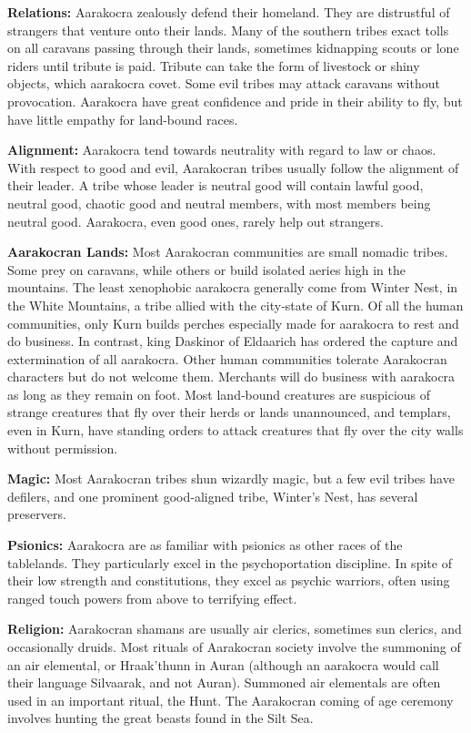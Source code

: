 \textbf{Relations:} Aarakocra zealously defend their homeland. They are distrustful of strangers that venture onto their lands. Many of the southern tribes exact tolls on all caravans passing through their lands, sometimes kidnapping scouts or lone riders until tribute is paid. Tribute can take the form of livestock or shiny objects, which aarakocra covet. Some evil tribes may attack caravans without provocation. Aarakocra have great confidence and pride in their ability to fly, but have little empathy for land-bound races.

\textbf{Alignment:} Aarakocra tend towards neutrality with regard to law or chaos. With respect to good and evil, Aarakocran tribes usually follow the alignment of their leader. A tribe whose leader is neutral good will contain lawful good, neutral good, chaotic good and neutral members, with most members being neutral good. Aarakocra, even good ones, rarely help out strangers.

\textbf{Aarakocran Lands:} Most Aarakocran communities are small nomadic tribes. Some prey on caravans, while others or build isolated aeries high in the mountains. The least xenophobic aarakocra generally come from Winter Nest, in the White Mountains, a tribe allied with the city‐state of Kurn. Of all the human communities, only Kurn builds perches especially made for aarakocra to rest and do business. In contrast, king Daskinor of Eldaarich has ordered the capture and extermination of all aarakocra. Other human communities tolerate Aarakocran characters but do not welcome them. Merchants will do business with aarakocra as long as they remain on foot. Most land‐bound creatures are suspicious of strange creatures that fly over their herds or lands unannounced, and templars, even in Kurn, have standing orders to attack creatures that fly over the city walls without permission.

\textbf{Magic:} Most Aarakocran tribes shun wizardly magic, but a few evil tribes have defilers, and one prominent good‐aligned tribe, Winter's Nest, has several preservers.

\textbf{Psionics:} Aarakocra are as familiar with psionics as other races of the tablelands. They particularly excel in the psychoportation discipline. In spite of their low strength and constitutions, they excel as psychic warriors, often using ranged touch powers from above to terrifying effect.

\textbf{Religion:} Aarakocran shamans are usually air clerics, sometimes sun clerics, and occasionally druids. Most rituals of Aarakocran society involve the summoning of an air elemental, or Hraak'thunn in Auran (although an aarakocra would call their language Silvaarak, and not Auran). Summoned air elementals are often used in an important ritual, the Hunt. The Aarakocran coming of age ceremony involves hunting the great beasts found in the Silt Sea.

